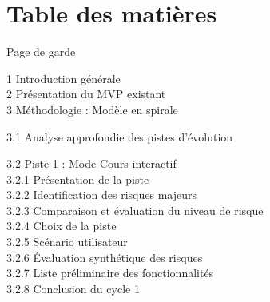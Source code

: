 \documentclass[12pt,a4paper]{report}
\begin{document}

\chapter*{Table des matières}

\noindent
\textcolor{orangeil}{Page de garde} 

\vspace{0.4cm}
\noindent
\textcolor{orangeil}{1 Introduction générale} \\
\textcolor{orangeil}{2 Présentation du MVP existant} \\
\textcolor{orangeil}{3 Méthodologie : Modèle en spirale} 

\vspace{0.2cm}
\hspace*{0.8cm}\textcolor{orangeil}{3.1 Analyse approfondie des pistes d’évolution} 

\vspace{0.2cm}
\hspace*{0.8cm}\textcolor{orangeil}{3.2 Piste 1 : Mode Cours interactif} \\
\hspace*{1.6cm}3.2.1 Présentation de la piste \\
\hspace*{1.6cm}3.2.2 Identification des risques majeurs \\
\hspace*{1.6cm}3.2.3 Comparaison et évaluation du niveau de risque \\
\hspace*{1.6cm}3.2.4 Choix de la piste \\
\hspace*{1.6cm}3.2.5 Scénario utilisateur \\
\hspace*{1.6cm}3.2.6 Évaluation synthétique des risques \\
\hspace*{1.6cm}3.2.7 Liste préliminaire des fonctionnalités \\
\hspace*{1.6cm}3.2.8 Conclusion du cycle 1 
\end{document}
